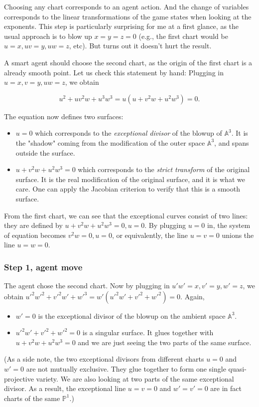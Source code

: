 \documentclass{article}
\theoremstyle{plain}
\theoremstyle{definition}
\theoremstyle{remark}
\begin{document}
Choosing any chart corresponds to an agent action. And the change of variables corresponds to the linear transformations of the game states when looking at the exponents. This step is particularly surprising for me at a first glance, as the usual approach is to blow up $x=y=z=0$ (e.g., the first chart would be $u=x, uv=y, uw=z$, etc). But turns out it doesn't hurt the result.

A smart agent should choose the second chart, as the origin of the first chart is a already smooth point. Let us check this statement by hand: Plugging in $u=x, v=y, uw=z$, we obtain 

$$u^2+uv^2w+u^3w^3=u(u+v^2w+u^2w^3)=0.$$

The equation now defines two surfaces:
\begin{itemize}
    \item $u=0$ which corresponds to the \emph{exceptional divisor} of the blowup of $\mathbb A^3$. It is the "shadow" coming from the modification of the outer space $\mathbb A^3$, and spans outside the surface.
    \item $u+v^2w+u^2w^3=0$ which corresponds to the \emph{strict transform} of the original surface. It is the real modification of the original surface, and it is what we care. One can apply the Jacobian criterion to verify that this is a smooth surface.
\end{itemize}

From the first chart, we can see that the exceptional curves consist of two lines: they are defined by $u+v^2w+u^2w^3=0, u=0$. By plugging $u=0$ in, the system of equation becomes $v^2w=0, u=0$, or equivalently, the line $u=v=0$ unions the line $u=w=0$.

\subsubsection{Step 1, agent move}
The agent chose the second chart. Now by plugging in $u'w'=x, v'=y, w'=z$, we obtain $u'^2w'^2+v'^2w'+w'^3=w'(u'^2w'+v'^2+w'^2)=0$. Again,
\begin{itemize}
    \item $w'=0$ is the exceptional divisor of the blowup on the ambient space $\mathbb A^3$.
    \item $u'^2w'+v'^2+w'^2=0$ is a singular surface. It glues together with $u+v^2w+u^2w^3=0$ and we are just seeing the two parts of the same surface.
\end{itemize}

(As a side note, the two exceptional divisors from different charts $u=0$ and $w'=0$ are not mutually exclusive. They glue together to form one single quasi-projective variety. We are also looking at two parts of the same exceptional divisor. As a result, the exceptional line $u=v=0$ and $w'=v'=0$ are in fact charts of the same $\mathbb P^1$.)
\end{document}
